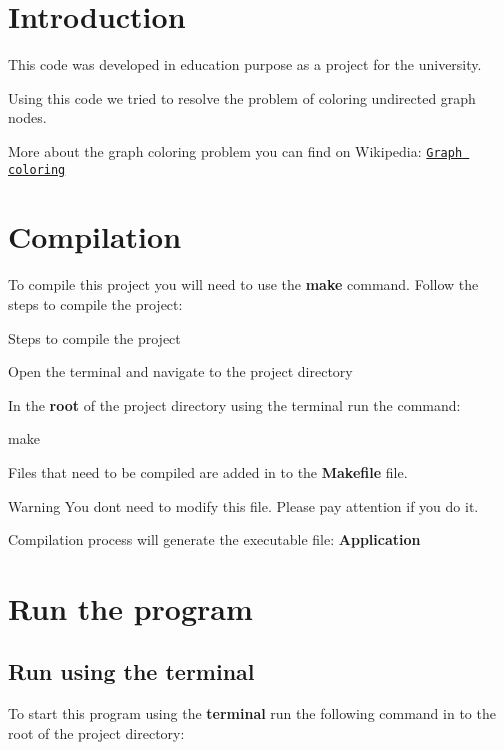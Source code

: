 \hypertarget{index_intro_section}{}\section{Introduction}\label{index_intro_section}
This code was developed in education purpose as a project for the university.

Using this code we tried to resolve the problem of coloring undirected graph nodes.

More about the graph coloring problem you can find on Wikipedia\+: \href{https://en.wikipedia.org/wiki/Graph_coloring}{\tt Graph coloring}\hypertarget{index_compilation_section}{}\section{Compilation}\label{index_compilation_section}
To compile this project you will need to use the {\bfseries make} command. Follow the steps to compile the project\+:


\begin{DoxyItemize}
\item Steps to compile the project
\begin{DoxyEnumerate}
\item Open the terminal and navigate to the project directory
\item In the {\bfseries root} of the project directory using the terminal run the command\+:
\begin{DoxyCode}
make 
\end{DoxyCode}
 Files that need to be compiled are added in to the {\bfseries Makefile} file. \begin{DoxyWarning}{Warning}
You don\textquotesingle{}t need to modify this file. Please pay attention if you do it.
\end{DoxyWarning}
Compilation process will generate the executable file\+: {\bfseries Application}
\end{DoxyEnumerate}
\end{DoxyItemize}\hypertarget{index_run_program}{}\section{Run the program}\label{index_run_program}
\hypertarget{index_run_with_term}{}\subsection{Run using the terminal}\label{index_run_with_term}
To start this program using the {\bfseries terminal} run the following command in to the root of the project directory\+:

